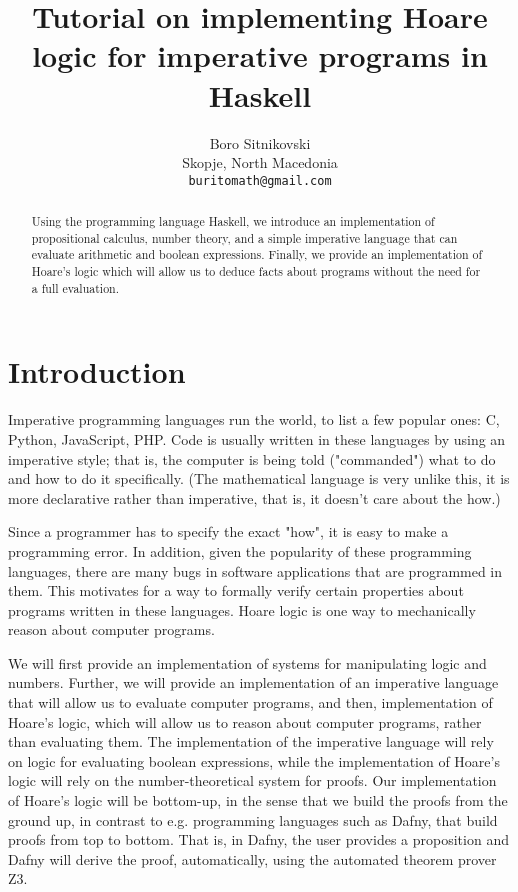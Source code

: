 \documentclass{article}
\title{Tutorial on implementing Hoare logic for imperative programs in Haskell}
\author{
  Boro Sitnikovski \\
  Skopje, North Macedonia \\
  \texttt{buritomath@gmail.com} \\
}
\begin{document}
\maketitle

\begin{abstract}
Using the programming language Haskell, we introduce an implementation of propositional calculus, number theory, and a simple imperative language that can evaluate arithmetic and boolean expressions. Finally, we provide an implementation of Hoare's logic which will allow us to deduce facts about programs without the need for a full evaluation.
\end{abstract}


\section{Introduction}

Imperative programming languages run the world, to list a few popular ones: C, Python, JavaScript, PHP. Code is usually written in these languages by using an imperative style; that is, the computer is being told ("commanded") what to do and how to do it specifically. (The mathematical language is very unlike this, it is more declarative rather than imperative, that is, it doesn't care about the how.)

Since a programmer has to specify the exact "how", it is easy to make a programming error. In addition, given the popularity of these programming languages, there are many bugs in software applications that are programmed in them. This motivates for a way to formally verify certain properties about programs written in these languages. Hoare logic is one way to mechanically reason about computer programs.

We will first provide an implementation of systems for manipulating logic and numbers. Further, we will provide an implementation of an imperative language that will allow us to evaluate computer programs, and then, implementation of Hoare's logic, which will allow us to reason about computer programs, rather than evaluating them. The implementation of the imperative language will rely on logic for evaluating boolean expressions, while the implementation of Hoare's logic will rely on the number-theoretical system for proofs. Our implementation of Hoare's logic will be bottom-up, in the sense that we build the proofs from the ground up, in contrast to e.g. programming languages such as Dafny\cite{b1}, that build proofs from top to bottom. That is, in Dafny, the user provides a proposition and Dafny will derive the proof, automatically, using the automated theorem prover Z3\cite{b2}.
\end{document}
